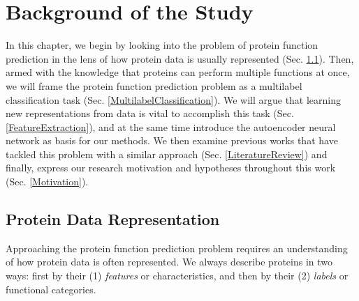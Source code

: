 %
%
%
%
%

\chapter{Background of the Study}
\label{BackgroundChapter}

\par In this chapter, we begin by looking into the problem of protein
function prediction in the lens of how protein data is usually represented
(Sec. \ref{ProteinFunctionPrediction}). Then, armed with the knowledge that
proteins can perform multiple functions at once, we will frame the protein
function prediction problem as a multilabel classification task (Sec.
\ref{MultilabelClassification}). We will argue that learning new
representations from data is vital to accomplish this task (Sec.
\ref{FeatureExtraction}), and at the same time introduce the autoencoder
neural network as basis for our methods. We then examine previous works that
have tackled this problem with a similar approach (Sec.
\ref{LiteratureReview}) and finally, express our research motivation and
hypotheses throughout this work (Sec. \ref{Motivation}).

\section{Protein Data Representation}
\label{ProteinFunctionPrediction}

Approaching the protein function prediction problem requires an
understanding of how protein data is often represented. We always
describe proteins in two ways: first by their (1) \textit{features} or
characteristics, and then by their (2) \textit{labels} or functional
categories.

